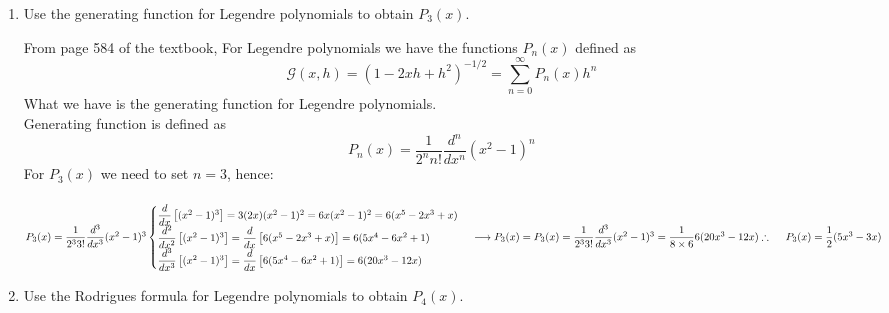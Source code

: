 \documentclass[fleqn]{article}
\begin{document}
\begin{enumerate}
\begin{enumerate}
      \end{enumerate}
    
    \item Use the generating function for Legendre polynomials to obtain $P_{3}\left(x\right)$.
    
      \textcolor{hwColor}{
        From page 584 of the textbook, For Legendre polynomials we have the functions $P_n(x)$ defined as
        $$\mathcal{G}(x, h)=(1-2xh+h^2)^{-1/2}=\sum\limits_{n=0}^{\infty} P_n(x)h^n$$
        What we have is the generating function for Legendre polynomials. \\
        Generating function is defined as
        $$P_n(x)=\dfrac{1}{2^n n!} \dfrac{d^n}{dx^n} (x^2-1)^n$$
        For $P_3(x)$ we need to set $n=3$, hence: \\
        \\
        $
          P_3(x)=\dfrac{1}{2^3 3!} \dfrac{d^3}{dx^3} (x^2-1)^3 \\
          \\
          \begin{cases}
            \dfrac{d}{dx} \left[(x^2-1)^3\right]=3(2x) (x^2-1)^2=6x(x^2-1)^2=6(x^5-2x^3+x)
            \\
            \dfrac{d^2}{dx^2} \left[(x^2-1)^3\right]=\dfrac{d}{dx} \left[6(x^5-2x^3+x)\right]=6(5x^4-6x^2+1)
            \\
            \dfrac{d^3}{dx^3} \left[(x^2-1)^3\right]=\dfrac{d}{dx} \left[6(5x^4-6x^2+1)\right]=6(20x^3-12x)
          \end{cases}
          \\
          \\
          \longrightarrow P_3(x)=P_3(x)=\dfrac{1}{2^3 3!} \dfrac{d^3}{dx^3} (x^2-1)^3
          =\dfrac{1}{8 \times 6} 6(20x^3-12x)
          \\
          \\
          \therefore ~~~~ P_3(x)=\dfrac{1}{2} (5x^3-3x)
        $
      }
    
    \item Use the Rodrigues formula for Legendre polynomials to obtain $P_{4}\left(x\right)$.
    

\end{enumerate}
\end{document}
